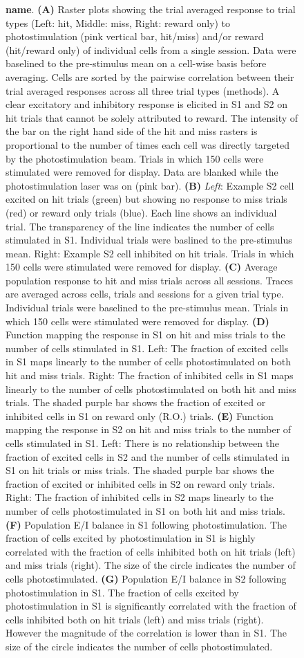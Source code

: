 \begin{figure}[htbp]
{\textbf{name}. \textbf{(A)} Raster plots showing the trial averaged response to trial types (Left: hit, Middle: miss, Right: reward only) to photostimulation (pink vertical bar, hit/miss)  and/or reward (hit/reward only) of individual cells from a single session. Data were baselined to the pre-stimulus mean on a cell-wise basis before averaging. Cells are sorted by the pairwise correlation between their trial averaged responses across all three trial types (methods). A clear excitatory and inhibitory response is elicited in S1 and S2 on hit trials that cannot be solely attributed to reward. The intensity of the bar on the right hand side of the hit and miss rasters is proportional to the number of times each cell was directly targeted by the photostimulation beam. Trials in which 150 cells were stimulated were removed for display. Data are blanked while the photostimulation laser was on (pink bar). \textbf{(B)} \textit{Left}: Example S2 cell excited on hit trials (green) but showing no response to miss trials (red) or reward only trials (blue). Each line shows an individual trial. The transparency of the line indicates the number of cells stimulated in S1. Individual trials were baslined to the pre-stimulus mean. Right: Example S2 cell inhibited on hit trials. Trials in which 150 cells were stimulated were removed for display. \textbf{(C)} Average population response to hit and miss trials across all sessions. Traces are averaged across cells, trials and sessions for a given trial type. Individual trials were baselined to the pre-stimulus mean. Trials in which 150 cells were stimulated were removed for display. \textbf{(D)} Function mapping the response in S1 on hit and miss trials to the number of cells stimulated in S1. Left: The fraction of excited cells in S1 maps linearly to the number of cells photostimulated on both hit and miss trials. Right: The fraction of inhibited cells in S1 maps linearly to the number of cells photostimulated on both hit and miss trials. The shaded purple bar shows the fraction of excited or inhibited cells in S1 on reward only (R.O.) trials. \textbf{(E)} Function mapping the response in S2 on hit and miss trials to the number of cells stimulated in S1. Left: There is no relationship between the fraction of excited cells in S2 and the number of cells stimulated in S1 on hit trials or miss trials. The shaded purple bar shows the fraction of excited or inhibited cells in S2 on reward only trials. Right: The fraction of inhibited cells in S2 maps linearly to the number of cells photostimulated in S1 on both hit and miss trials. \textbf{(F)} Population E/I balance in S1 following photostimulation. The fraction of cells excited by photostimulation in S1 is highly correlated with the fraction of cells inhibited both on hit trials (left) and miss trials (right). The size of the circle indicates the number of cells photostimulated. \textbf{(G)} Population E/I balance in S2 following photostimulation in S1. The fraction of cells excited by photostimulation in S1 is significantly correlated with the fraction of cells inhibited both on hit trials (left) and miss trials (right). However the magnitude of the correlation is lower than in S1. The size of the circle indicates the number of cells photostimulated. 

}
\end{figure}
